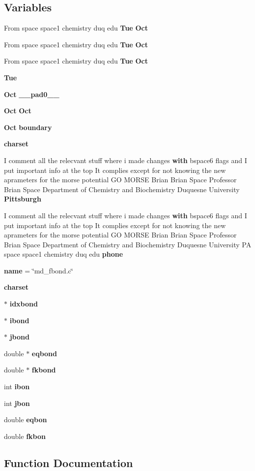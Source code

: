 \subsection*{Variables}
\begin{CompactItemize}
\item 
From space space1 chemistry duq edu {\bf Tue} {\bf Oct}
\item 
From space space1 chemistry duq edu {\bf Tue} {\bf Oct}
\item 
From space space1 chemistry duq edu {\bf Tue} {\bf Oct}
\item 
{\bf Tue}
\item 
{\bf Oct} {\bf \_\-\_\-pad0\_\-\_\-}
\item 
{\bf Oct} {\bf Oct}
\item 
{\bf Oct} {\bf boundary}
\item 
{\bf charset}
\item 
I comment all the relecvant stuff where i made changes {\bf with} bspace6 flags and I put important info at the top It complies except for not knowing the new aprameters for the morse potential GO MORSE Brian Brian Space Professor Brian Space Department of Chemistry and Biochemistry Duquesne University {\bf Pittsburgh}
\item 
I comment all the relecvant stuff where i made changes {\bf with} bspace6 flags and I put important info at the top It complies except for not knowing the new aprameters for the morse potential GO MORSE Brian Brian Space Professor Brian Space Department of Chemistry and Biochemistry Duquesne University PA space space1 chemistry duq edu {\bf phone}
\item 
{\bf name} = \char`\"{}md\_\-fbond.c\char`\"{}
\item 
{\bf charset}
\item 
$\ast$ {\bf idxbond}
\item 
$\ast$ {\bf ibond}
\item 
$\ast$ {\bf jbond}
\item 
double $\ast$ {\bf eqbond}
\item 
double $\ast$ {\bf fkbond}
\item 
int {\bf ibon}
\item 
int {\bf jbon}
\item 
double {\bf eqbon}
\item 
double {\bf fkbon}
\end{CompactItemize}


\subsection{Function Documentation}
